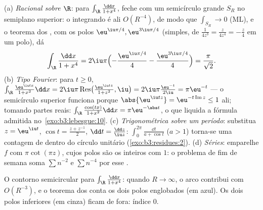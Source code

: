 \begin{example}
\label{ex:b3:residues:integrals}
(a) \emph{Racional sobre $\R$}: para $\int_\R\frac{\dd x}{1 +
x^4}$, feche com um semicírculo
grande $S_R$ no semiplano superior: o integrando é ali $O(R^{-4})$, de modo
que $\int_{S_R} \to 0$ (ML), e o teorema dos , com os polos $\eu^{\iu\pi/4}, \eu^{3\iu\pi/4}$ (simples,
de  $\frac1{4z^3} = \frac{z}{4z^4} = -\frac z4$ em um polo), dá
\[
\int_\R\frac{\dd x}{1 + x^4}
= 2\iu\pi\Bigl(-\frac{\eu^{\iu\pi/4}}4 -
\frac{\eu^{3\iu\pi/4}}4\Bigr)
= \frac{\pi}{\sqrt2} .
\]
(b) \emph{Tipo Fourier}: para $t \geq 0$, $\int_\R\frac{\eu^{\iu tx}}{1 + x^2}\dd x =
2\iu\pi\operatorname{Res}\bigl(\tfrac{\eu^{\iu tz}}{1+z^2},
\iu\bigr) = 2\iu\pi\frac{\eu^{-t}}{2\iu} = \pi\eu^{-t}$ --- o semicírculo superior
funciona porque $\abs{\eu^{\iu tz}} =
\eu^{-t\operatorname{Im}z} \leq 1$ ali; tomando partes reais: $\int_\R\frac{\cos(tx)}{1+x^2}\dd x = \pi\eu^{-\abs t}$, o que liquida a
fórmula admitida no~\cref{exo:b3:lebesgue:10}.
(c) \emph{Trigonométrica sobre um período}: substitua $z =
\eu^{\iu t}$, $\cos t = \frac{z + z^{-1}}2$,
$\dd t =
\frac{\dd z}{\iu z}$: $\int_0^{2\pi}\frac{\dd t}{a + \cos t}$ ($a > 1$) torna-se uma contagem de  dentro do
círculo unitário (\cref{exo:b3:residues:2}).
(d) \emph{Séries}: emparelhe $f$ com $\pi\cot(\pi z)$, cujos polos são os
inteiros com  $1$: o problema de fim de semana soma $\sum n^{-2}$ e
$\sum n^{-4}$ por esse .
\end{example}

\begin{omfigure}

{\small O contorno semicircular para $\int_\R\frac{\dd x}{1 +
x^4}$: quando $R \to \infty$, o arco
contribui com $O(R^{-3})$, e o teorema dos  conta os dois polos
englobados (em azul). Os dois polos inferiores (em cinza) ficam de
fora: índice $0$.}
\end{omfigure}

